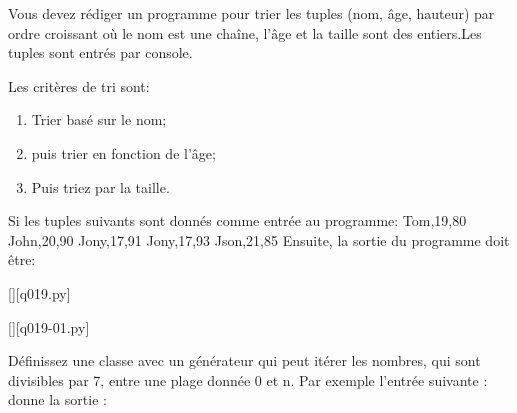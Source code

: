\question
Vous devez rédiger un programme pour trier les tuples (nom, âge, hauteur) par ordre croissant où le nom est une chaîne, l'âge et la taille sont des entiers.Les tuples sont entrés par console.\newline

Les critères de tri sont:\newline
\begin{enumerate}
\item Trier basé sur le nom;
\item puis trier en fonction de l'âge;
\item Puis triez par la taille.
\end{enumerate}

Si les tuples suivants sont donnés comme entrée au programme:\newline
Tom,19,80\newline
John,20,90\newline
Jony,17,91\newline
Jony,17,93\newline
Json,21,85
Ensuite, la sortie du programme doit être:

\renewcommand{\nomfichier}{q019.py}
\begin{solution}
    \pythonfile{\chemincode \nomfichier}[][\nomfichier]
\end{solution}

\renewcommand{\nomfichier}{q019-01.py}
\begin{solution}
    \pythonfile{\chemincode \nomfichier}[][\nomfichier]
\end{solution}

\question
Définissez une classe avec un générateur qui peut itérer les nombres, qui sont divisibles par 7, entre une plage donnée 0 et n.
Par exemple l'entrée suivante :\newline
donne la sortie :\newline

